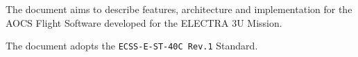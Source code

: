 The document aims to describe features, architecture and implementation for the AOCS Flight Software developed for the ELECTRA 3U Mission. 

The document adopts the \texttt{ECSS-E-ST-40C Rev.1} Standard. 